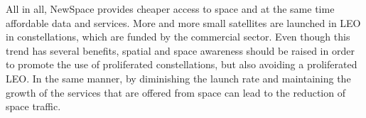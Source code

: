 All in all, NewSpace provides cheaper access to space and at the same time affordable data and services. More and more small satellites are launched in LEO in constellations, which are funded by the commercial sector. Even though this trend has several benefits, spatial and space awareness should be raised in order to promote the use of proliferated constellations, but also avoiding a proliferated LEO. \cite{pLEO} In the same manner, by diminishing the launch rate and maintaining the growth of the services that are offered from space can lead to the reduction of space traffic. %


